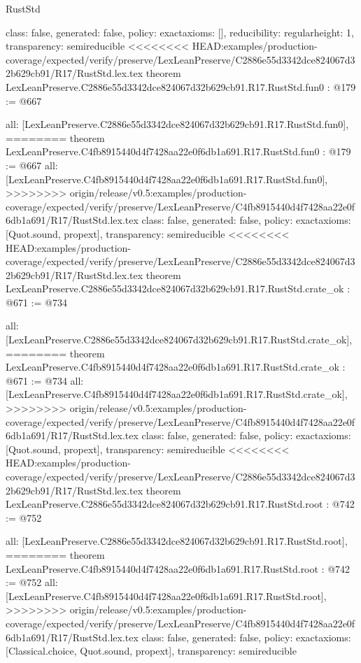 \begin{lexlean}{RustStd}
\begin{coremodule}
{\begin{coremodule}
{{{  class: false,
  generated: false,
  policy: exact{axioms: []},
  reducibility: regular{height: 1},
  transparency: semireducible
}
<<<<<<<< HEAD:examples/production-coverage/expected/verify/preserve/LexLeanPreserve/C2886e55d3342dce824067d32b629cb91/R17/RustStd.lex.tex
theorem LexLeanPreserve.C2886e55d3342dce824067d32b629cb91.R17.RustStd.fun0 : @179 := @667 {
  all: [LexLeanPreserve.C2886e55d3342dce824067d32b629cb91.R17.RustStd.fun0],
========
theorem LexLeanPreserve.C4fb8915440d4f7428aa22e0f6db1a691.R17.RustStd.fun0 : @179 := @667 {
  all: [LexLeanPreserve.C4fb8915440d4f7428aa22e0f6db1a691.R17.RustStd.fun0],
>>>>>>>> origin/release/v0.5:examples/production-coverage/expected/verify/preserve/LexLeanPreserve/C4fb8915440d4f7428aa22e0f6db1a691/R17/RustStd.lex.tex
  class: false,
  generated: false,
  policy: exact{axioms: [Quot.sound, propext]},
  transparency: semireducible
}
<<<<<<<< HEAD:examples/production-coverage/expected/verify/preserve/LexLeanPreserve/C2886e55d3342dce824067d32b629cb91/R17/RustStd.lex.tex
theorem LexLeanPreserve.C2886e55d3342dce824067d32b629cb91.R17.RustStd.crate_ok : @671 := @734 {
  all: [LexLeanPreserve.C2886e55d3342dce824067d32b629cb91.R17.RustStd.crate_ok],
========
theorem LexLeanPreserve.C4fb8915440d4f7428aa22e0f6db1a691.R17.RustStd.crate_ok : @671 := @734 {
  all: [LexLeanPreserve.C4fb8915440d4f7428aa22e0f6db1a691.R17.RustStd.crate_ok],
>>>>>>>> origin/release/v0.5:examples/production-coverage/expected/verify/preserve/LexLeanPreserve/C4fb8915440d4f7428aa22e0f6db1a691/R17/RustStd.lex.tex
  class: false,
  generated: false,
  policy: exact{axioms: [Quot.sound, propext]},
  transparency: semireducible
}
<<<<<<<< HEAD:examples/production-coverage/expected/verify/preserve/LexLeanPreserve/C2886e55d3342dce824067d32b629cb91/R17/RustStd.lex.tex
theorem LexLeanPreserve.C2886e55d3342dce824067d32b629cb91.R17.RustStd.root : @742 := @752 {
  all: [LexLeanPreserve.C2886e55d3342dce824067d32b629cb91.R17.RustStd.root],
========
theorem LexLeanPreserve.C4fb8915440d4f7428aa22e0f6db1a691.R17.RustStd.root : @742 := @752 {
  all: [LexLeanPreserve.C4fb8915440d4f7428aa22e0f6db1a691.R17.RustStd.root],
>>>>>>>> origin/release/v0.5:examples/production-coverage/expected/verify/preserve/LexLeanPreserve/C4fb8915440d4f7428aa22e0f6db1a691/R17/RustStd.lex.tex
  class: false,
  generated: false,
  policy: exact{axioms: [Classical.choice, Quot.sound, propext]},
  transparency: semireducible
}

}}}}}
\end{coremodule}}
\end{coremodule}
\end{lexlean}
